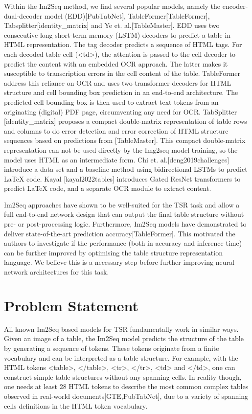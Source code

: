 \documentclass[11pt,a4paper]{article}
\begin{document}
Within the Im2Seq method, we find several popular models, namely the encoder-dual-decoder model (EDD)[PubTabNet], TableFormer[TableFormer], Tabsplitter[identity\_matrix] and Ye et. al.[TableMaster]. EDD uses two consecutive long short-term memory (LSTM) decoders to predict a table in HTML representation. The tag decoder predicts a sequence of HTML tags. For each decoded table cell (<td>), the attention is passed to the cell decoder to predict the content with an embedded OCR approach. The latter makes it susceptible to transcription errors in the cell content of the table. TableFormer address this reliance on OCR and uses two transformer decoders for HTML structure and cell bounding box prediction in an end-to-end architecture. The predicted cell bounding box is then used to extract text tokens from an originating (digital) PDF page, circumventing any need for OCR. TabSplitter [identity\_matrix] proposes a compact double-matrix representation of table rows and columns to do error detection and error correction of HTML structure sequences based on predictions from [TableMaster]. This compact double-matrix representation can not be used directly by the Img2seq model training, so the model uses HTML as an intermediate form. Chi et. al.[deng2019challenges] introduce a data set and a baseline method using bidirectional LSTMs to predict LaTeX code. Kayal [kayal2022tables] introduces Gated ResNet transformers to predict LaTeX code, and a separate OCR module to extract content.

Im2Seq approaches have shown to be well-suited for the TSR task and allow a full end-to-end network design that can output the final table structure without pre- or post-processing logic. Furthermore, Im2Seq models have demonstrated to deliver state-of-the-art prediction accuracy[TableFormer]. This motivated the authors to investigate if the performance (both in accuracy and inference time) can be further improved by optimising the table structure representation language. We believe this is a necessary step before further improving neural network architectures for this task.

\section{Problem Statement}

All known Im2Seq based models for TSR fundamentally work in similar ways. Given an image of a table, the Im2Seq model predicts the structure of the table by generating a sequence of tokens. These tokens originate from a finite vocabulary and can be interpreted as a table structure. For example, with the HTML tokens <table>, </table>, <tr>, </tr>, <td> and </td>, one can construct simple table structures without any spanning cells. In reality though, one needs at least 28 HTML tokens to describe the most common complex tables observed in real-world documents[GTE,PubTabNet], due to a variety of spanning cells definitions in the HTML token vocabulary.
\end{document}
